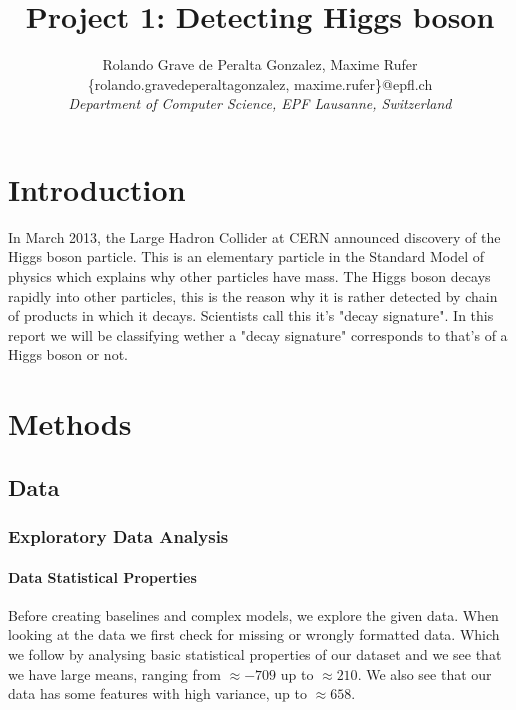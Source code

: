 \documentclass[sigconf, nonacm]{acmart}
\begin{document}
\title{Project 1: Detecting Higgs boson}

\author{
  Rolando Grave de Peralta Gonzalez, Maxime Rufer\\
  \{rolando.gravedeperaltagonzalez, maxime.rufer\}@epfl.ch
  \\
  \textit{Department of Computer Science, EPF Lausanne, Switzerland}
}
\begin{abstract}
\end{abstract}

\maketitle



\section{Introduction}
In March 2013, the Large Hadron Collider at CERN announced discovery of the Higgs boson particle. This is an elementary particle in the Standard Model of physics which explains why other particles have mass. The Higgs boson decays rapidly into other particles, this is the reason why it is rather detected by chain of products in which it decays. Scientists call this it's "decay signature". In this report we will be classifying wether a "decay signature" corresponds to that's of a Higgs boson or not.



\section{Methods}
\subsection{Data}

\subsubsection{Exploratory Data Analysis}
\paragraph{Data Statistical Properties}Before creating baselines and complex models, we explore the given data. When looking at the data we first check for missing or wrongly formatted data. Which we follow by analysing basic statistical properties of our dataset and we see that we have large means, ranging from $\approx -709 $ up to $\approx 210$. We also see that our data has some features with high variance, up to $\approx 658$. \\
\end{document}
